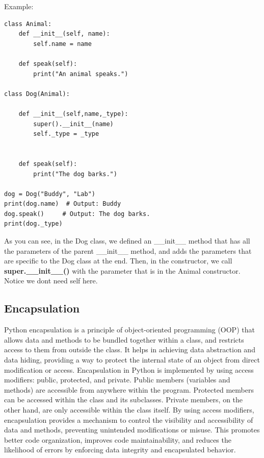 \documentclass{report}
\begin{document}
    Example:
    \begin{verbatim}
class Animal:
    def __init__(self, name):
        self.name = name

    def speak(self):
        print("An animal speaks.")

class Dog(Animal):

    def __init__(self,name,_type):
        super().__init__(name)
        self._type = _type


    def speak(self):
        print("The dog barks.")

dog = Dog("Buddy", "Lab")
print(dog.name)  # Output: Buddy
dog.speak()     # Output: The dog barks.
print(dog._type)
    \end{verbatim}
    \bigbreak \noindent 
    As you can see, in the Dog class, we defined an \_\_init\_\_ method that has all the parameters of the parent \_\_init\_\_ method, and adds the parameters that are specific to the Dog class at the end. Then, in the constructor, we call \textbf{super.\_\_init\_\_()} with the parameter that is in the Animal constructor. Notice we dont need self here.

    \bigbreak \noindent \bigbreak \noindent 
    \subsection{Encapsulation}
    \bigbreak \noindent 
    Python encapsulation is a principle of object-oriented programming (OOP) that allows data and methods to be bundled together within a class, and restricts access to them from outside the class. It helps in achieving data abstraction and data hiding, providing a way to protect the internal state of an object from direct modification or access.
    \bigbreak \noindent 
    Encapsulation in Python is implemented by using access modifiers: public, protected, and private. Public members (variables and methods) are accessible from anywhere within the program. Protected members can be accessed within the class and its subclasses. Private members, on the other hand, are only accessible within the class itself.
    \bigbreak \noindent 
    By using access modifiers, encapsulation provides a mechanism to control the visibility and accessibility of data and methods, preventing unintended modifications or misuse. This promotes better code organization, improves code maintainability, and reduces the likelihood of errors by enforcing data integrity and encapsulated behavior.

    \bigbreak \noindent \bigbreak \noindent 
\end{document}
